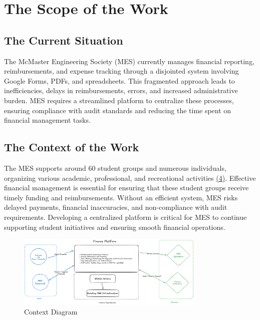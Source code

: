\documentclass[12pt]{article}
\begin{document}
\section{The Scope of the Work}

\subsection{The Current Situation}
The McMaster Engineering Society (MES) currently manages financial reporting, reimbursements, and expense tracking through a disjointed system involving Google Forms, PDFs, and spreadsheets. This fragmented approach leads to inefficiencies, delays in reimbursements, errors, and increased administrative burden. MES requires a streamlined platform to centralize these processes, ensuring compliance with audit standards and reducing the time spent on financial management tasks.

\subsection{The Context of the Work}
The MES supports around 60 student groups and numerous individuals, organizing various academic, professional, and recreational activities \hyperlink{Ref4}{(4)}. Effective financial management is essential for ensuring that these student groups receive timely funding and reimbursements. Without an efficient system, MES risks delayed payments, financial inaccuracies, and non-compliance with audit requirements. Developing a centralized platform is critical for MES to continue supporting student initiatives and ensuring smooth financial operations.

\begin{figure}[h!]
    \centering
    \includegraphics[width=0.8\textwidth]{./imgs/context-diagram.png}
    \caption{Context Diagram}
\end{figure}
\end{document}
